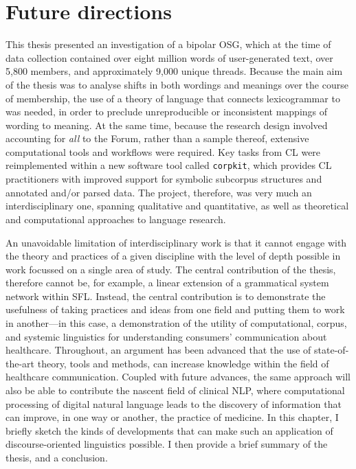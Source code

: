 
\chapter{Future directions} \label{chap:conclusion}

This thesis presented an investigation of a \gls{bipolar} \gls{OSG}, which at the time of data collection contained over eight million words of user\hyp{}generated text, over 5,800 \glspl{member}, and approximately 9,000 unique \glspl{thread}. Because the main aim of the thesis was to analyse shifts in both wordings and meanings over the course of membership, the use of a theory of language that connects \gls{lexicogrammar} to  was needed, in order to preclude unreproducible or inconsistent mappings of wording to meaning. At the same time, because the research design involved accounting for \emph{all}  to the \gls{Forum}, rather than a sample thereof, extensive computational tools and workflows were required. Key tasks from \gls{CL} were reimplemented within a new software tool called \texttt{corpkit}, which provides \gls{CL} practitioners with improved support for symbolic subcorpus structures and annotated and\slash or parsed data. The project, therefore, was very much an interdisciplinary one, spanning qualitative and quantitative, as well as theoretical and computational approaches to language research.

An unavoidable limitation of interdisciplinary work is that it cannot engage with the theory and practices of a given discipline with the level of depth possible in work focussed on a single area of study. The central contribution of the thesis, therefore cannot be, for example, a linear extension of a grammatical system network within \gls{SFL}. Instead, the central contribution is to demonstrate the usefulness of taking practices and ideas from one field and putting them to work in another---in this case, a demonstration of the utility of computational, corpus, and systemic linguistics for understanding \glspl{consumer}' communication about healthcare. Throughout, an argument has been advanced that the use of state\hyp{}of\hyp{}the\hyp{}art theory, tools and methods, can increase knowledge within the field of healthcare communication. Coupled with future advances, the same approach will also be able to contribute the nascent field of clinical \gls{NLP}, where computational processing of digital natural language leads to the discovery of information that can improve, in one way or another, the practice of medicine. In this chapter, I briefly sketch the kinds of developments that can make such an application of discourse\hyp{}oriented linguistics possible. I then provide a brief summary of the thesis, and a conclusion.

